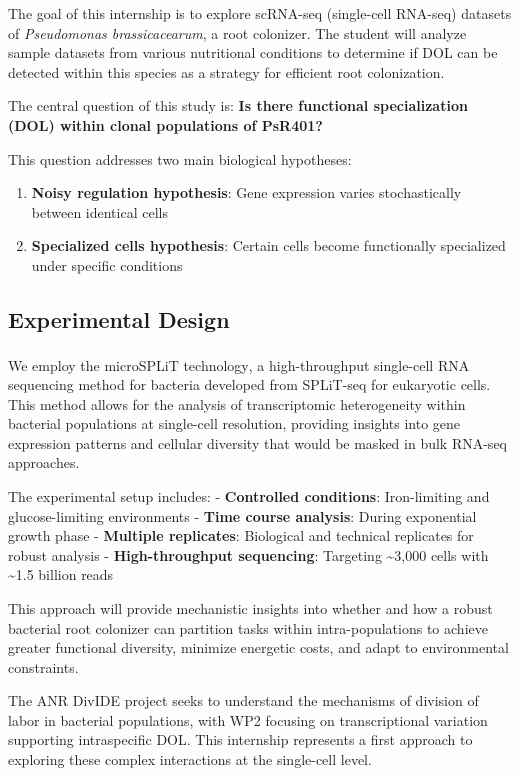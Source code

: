 \documentclass[
  11pt,
  a4paper,
]{report}
\providecommand{\tightlist}{%
  \setlength{\itemsep}{0pt}\setlength{\parskip}{0pt}}\usepackage{longtable,booktabs,array}
\begin{document}
The goal of this internship is to explore scRNA-seq (single-cell
RNA-seq) datasets of \emph{Pseudomonas brassicacearum}, a root
colonizer. The student will analyze sample datasets from various
nutritional conditions to determine if DOL can be detected within this
species as a strategy for efficient root colonization.

The central question of this study is: \textbf{Is there functional
specialization (DOL) within clonal populations of PsR401?}

This question addresses two main biological hypotheses:

\begin{enumerate}
\def\labelenumi{\arabic{enumi}.}
\tightlist
\item
  \textbf{Noisy regulation hypothesis}: Gene expression varies
  stochastically between identical cells
\item
  \textbf{Specialized cells hypothesis}: Certain cells become
  functionally specialized under specific conditions
\end{enumerate}

\subsection{Experimental Design}\label{experimental-design}

We employ the microSPLiT
technology\textsuperscript{}, a
high-throughput single-cell RNA sequencing method for bacteria developed
from SPLiT-seq for eukaryotic cells. This method allows for the analysis
of transcriptomic heterogeneity within bacterial populations at
single-cell resolution, providing insights into gene expression patterns
and cellular diversity that would be masked in bulk RNA-seq approaches.

The experimental setup includes: - \textbf{Controlled conditions}:
Iron-limiting and glucose-limiting environments - \textbf{Time course
analysis}: During exponential growth phase - \textbf{Multiple
replicates}: Biological and technical replicates for robust analysis -
\textbf{High-throughput sequencing}: Targeting \textasciitilde3,000
cells with \textasciitilde1.5 billion reads

This approach will provide mechanistic insights into whether and how a
robust bacterial root colonizer can partition tasks within
intra-populations to achieve greater functional diversity, minimize
energetic costs, and adapt to environmental constraints.

The ANR DivIDE project seeks to understand the mechanisms of division of
labor in bacterial populations, with WP2 focusing on transcriptional
variation supporting intraspecific DOL. This internship represents a
first approach to exploring these complex interactions at the
single-cell level.
\end{document}
